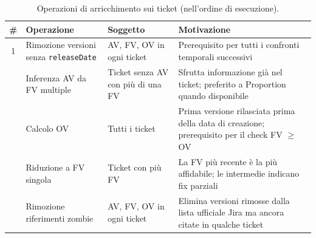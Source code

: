 \begin{table}[h!]
\centering
\small
\begin{tabular}{@{}cp{}p{}p{}@{}}
\toprule
\textbf{\#} & \textbf{Operazione} & \textbf{Soggetto} & \textbf{Motivazione} \\
\midrule
1 & Rimozione versioni senza \texttt{releaseDate} &
    AV, FV, OV in ogni ticket &
    Prerequisito per tutti i confronti temporali successivi \\
\addlinespace
2 & Inferenza AV da FV multiple &
    Ticket senza AV con più di una FV &
    Sfrutta informazione già nel ticket; preferito a Proportion quando disponibile \\
\addlinespace
3 & Calcolo OV &
    Tutti i ticket &
    Prima versione rilasciata prima della data di creazione; prerequisito per il check FV $\geq$ OV \\
\addlinespace
4 & Riduzione a FV singola &
    Ticket con più FV &
    La FV più recente è la più affidabile; le intermedie indicano fix parziali \\
\addlinespace
5 & Rimozione riferimenti zombie &
    AV, FV, OV in ogni ticket &
    Elimina versioni rimosse dalla lista ufficiale Jira ma ancora citate in qualche ticket \\
\bottomrule
\end{tabular}
\caption{Operazioni di arricchimento sui ticket (nell'ordine di esecuzione).}
\label{tab:m1-enrichment}
\end{table}

